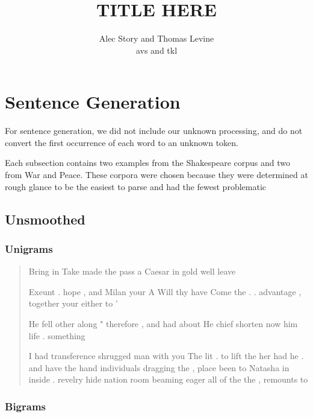 \documentclass{article}
\title{TITLE HERE}
\author{Alec Story and Thomas Levine\\\small{avs\osn{38} and tkl\osn{22}}}
\begin{document}
\maketitle
\section*{Sentence Generation}
	
	For sentence generation, we did not include our unknown processing, and do
	not convert the first occurrence of each word to an unknown token.

	Each subsection contains two examples from the Shakespeare corpus and two
	from War and Peace.  These corpora were chosen because they were determined
	at rough glance to be the easiest to parse and had the fewest problematic

	\subsection*{Unsmoothed}

		\subsubsection*{Unigrams}

			\begin{quote}

			Bring in Take made the pass a Caesar in gold well leave

			Exeunt . hope , and Milan your A Will thy have Come the . .
			advantage , together your either to '

			He fell other along " therefore , and had about He chief shorten now
			him life . something

			I had transference shrugged man with you The lit . to lift the her
			had he . and have the hand individuals dragging the , place been to
			Natasha in inside . revelry hide nation room beaming eager all of
			the the , remounts to

			\end{quote}

		\subsubsection*{Bigrams}
\end{document}
